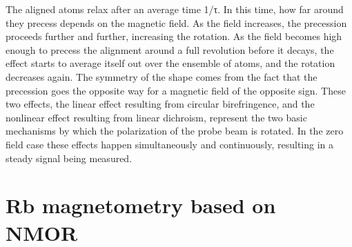 \documentclass[12pt]{report}
\begin{document}
The aligned atoms relax after an average time 1/τ. In this time, how far around they precess depends on the magnetic field. As the field increases, the precession proceeds further and further, increasing the rotation. As the field becomes high enough to precess the alignment around a full revolution before it decays, the effect starts to average itself out over the ensemble of atoms, and the rotation decreases again. The symmetry of the shape comes from the fact that the precession goes the opposite way for a magnetic field of the opposite sign.
These two effects, the linear effect resulting from circular birefringence, and the nonlinear effect resulting from linear dichroism, represent the two basic mechanisms by which the polarization of the probe beam is rotated. In the zero field case these effects happen simultaneously and continuously, resulting in a steady signal being measured.


\section{Rb magnetometry based on NMOR}
\end{document}
